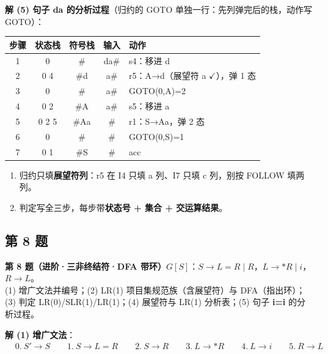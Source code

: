 \documentclass[12pt,a4paper,fontset=windows]{ctexart}
\newcommand{\ok}{\ensuremath{\checkmark}}
\begin{document}
\textbf{解 (5) 句子 da 的分析过程}（归约的 GOTO 单独一行：先列弹完后的栈，动作写 GOTO）：

\begin{center}
\renewcommand{\arraystretch}{1.25}
\begin{tabular}{c c c c p{5.6cm}}
\toprule
\textbf{步骤} & \textbf{状态栈} & \textbf{符号栈} & \textbf{输入} & \textbf{动作} \\
\midrule
1 & 0 & \# & da\# & s4：移进 d \\
2 & 0 4 & \#d & a\# & r5：A→d（展望符 a \ok），弹 1 态 \\
3 & 0 & \# & a\# & GOTO(0,A)=2 \\
4 & 0 2 & \#A & a\# & s5：移进 a \\
5 & 0 2 5 & \#Aa & \# & r1：S→Aa，弹 2 态 \\
6 & 0 & \# & \# & GOTO(0,S)=1 \\
7 & 0 1 & \#S & \# & acc \\
\bottomrule
\end{tabular}
\end{center}

\begin{warnbox}[易错]
\begin{enumerate}
\item 归约只填\textbf{展望符列}：r5 在 I4 只填 a 列、I7 只填 c 列，别按 FOLLOW 填两列。
\item 判定写全三步，每步带\textbf{状态号 + 集合 + 交运算结果}。
\end{enumerate}
\end{warnbox}

\subsection*{第 8 题}

\begin{qbox}
{\large\bfseries 第 8 题（进阶·三非终结符·DFA 带环）}\quad $G[S]$：$S \to L{=}R \mid R$，$L \to {*}R \mid i$，$R \to L$。\\
(1) 增广文法并编号；(2) LR(1) 项目集规范族（含展望符）与 DFA（指出环）；(3) 判定 LR(0)/SLR(1)/LR(1)；(4) 展望符与 LR(1) 分析表；(5) 句子 \textbf{i=i} 的分析过程。
\end{qbox}

\textbf{解 (1) 增广文法}：
\[
\begin{aligned}
& 0.\ S' \to S \qquad 1.\ S \to L = R \qquad 2.\ S \to R \qquad 3.\ L \to * R \qquad 4.\ L \to i \qquad 5.\ R \to L
\end{aligned}
\]
\end{document}

